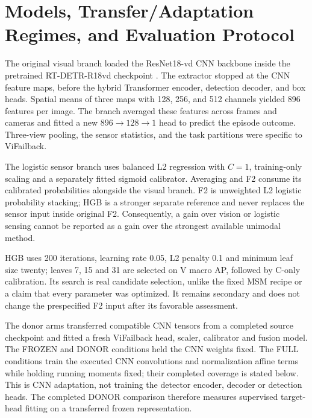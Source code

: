 \section{Models, Transfer/Adaptation Regimes, and Evaluation Protocol}
The original visual branch loaded the ResNet18-vd CNN backbone inside the pretrained
RT-DETR-R18vd checkpoint \citep{Zhao2024RTDETR}. The extractor stopped at the CNN
feature maps, before the hybrid Transformer encoder, detection decoder, and box heads.
Spatial means of three maps with 128, 256, and 512 channels yielded 896 features per
image. The branch averaged these features across frames and cameras and fitted a new
$896\rightarrow128\rightarrow1$ head to predict the episode outcome. Three-view pooling,
the sensor statistics, and the task partitions were specific to ViFailback.

The logistic sensor branch uses balanced L2 regression with $C=1$, training-only scaling
and a separately fitted sigmoid calibrator. Averaging and F2 consume its calibrated
probabilities alongside the visual branch. F2 is unweighted L2 logistic probability
stacking; HGB is a stronger separate reference and never replaces the sensor input
inside original F2. Consequently, a gain over vision or logistic sensing cannot be
reported as a gain over the strongest available unimodal method.

HGB uses 200 iterations, learning rate 0.05, L2 penalty 0.1 and minimum leaf size
twenty; leaves 7, 15 and 31 are selected on V macro AP, followed by C-only calibration.
Its search is real candidate selection, unlike the fixed MSM recipe or a claim that
every parameter was optimized. It remains secondary and does not change the prespecified
F2 input after its favorable assessment.


The donor arms transferred compatible CNN tensors from a completed source checkpoint and
fitted a fresh ViFailback head, scaler, calibrator and fusion model. The FROZEN and
DONOR conditions held the CNN weights fixed. The FULL conditions train the executed CNN
convolutions and normalization affine terms while holding running moments fixed; their
completed coverage is stated below. This is CNN adaptation, not training the detector
encoder, decoder or detection heads. The completed DONOR comparison therefore measures
supervised target-head fitting on a transferred frozen representation.


